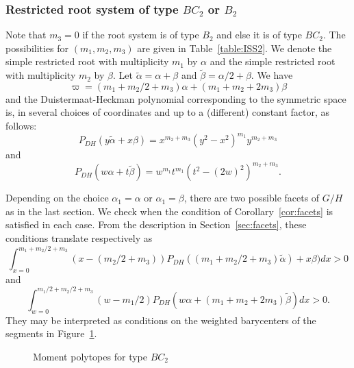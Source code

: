 \documentclass[JEP,XML,SOM,Unicode, NoEqCountersInSection, NoFloatCountersInSection]{cedram}
\theoremstyle{plain}
\theoremstyle{definition}
\begin{document}
\subsubsection{Restricted root system of type $BC_2$ or $B_2$}

Note that $m_3=0$ if the root system is of type $B_2$ and else
it is of type $BC_2$.
The possibilities for $(m_1,m_2,m_3)$ are given in Table~\ref{table:ISS2}.
We denote the simple restricted root with multiplicity $m_1$ by $\alpha$
and the simple restricted root with multiplicity $m_2$ by $\beta$.
Let $\tilde{\alpha}= \alpha+\beta$ and
$\tilde{\beta}= \alpha/2+\beta$.
We have
\[ \varpi = (m_1+m_2/2+m_3)\alpha+(m_1+m_2+2m_3)\beta \]
and the Duistermaat-Heckman polynomial corresponding to the
symmetric space is, in several choices
of coordinates and up to a (different) constant factor, as follows:
\begin{equation*}
P_{DH}(y\tilde{\alpha}+x\beta)= x^{m_2+m_3}(y^2-x^2)^{m_1}y^{m_2+m_3}
\end{equation*}
and
\begin{equation*}
P_{DH}(w\alpha+t\tilde{\beta})=w^{m_1}t^{m_1}(t^2-(2w)^2)^{m_2+m_3}.
\end{equation*}

Depending on the choice $\alpha_1=\alpha$ or $\alpha_1=\beta$,
there are two possible facets of $G/H$ as in the last section.
We check when the condition of Corollary~\ref{cor:facets} is satisfied
in each case.
From the description in Section~\ref{sec:facets}, these conditions translate
respectively as
\begin{equation*}
\int_{x=0}^{m_1+m_2/2+m_3}
(x-(m_2/2+m_3))
P_{DH}((m_1+m_2/2+m_3)\tilde{\alpha})+x\beta)dx
>0
\end{equation*}
and
\begin{equation*}
\int_{w=0}^{m_1/2+m_2/2+m_3}
(w-m_1/2)
P_{DH}(w\alpha+(m_1+m_2+2m_3)\tilde{\beta})dx
>0.
\end{equation*}
They may be interpreted as conditions on the weighted barycenters of the segments
in Figure~\ref{fig:BC2pol}.

\begin{figure}
\smaller\centering
{}
\caption{Moment polytopes for type $BC_2$}
\label{fig:BC2pol}
\end{figure}
\end{document}
